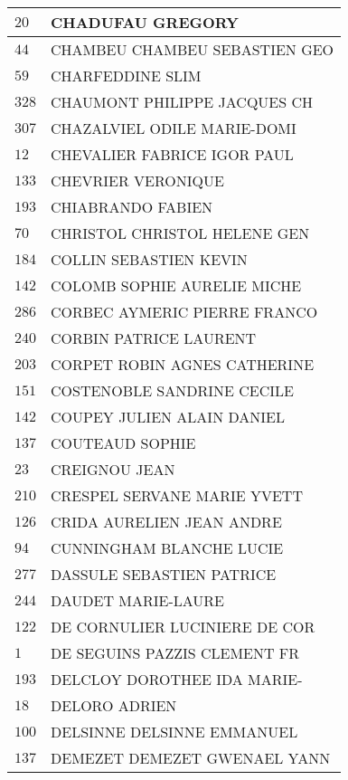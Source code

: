 \begin{xltabular}{\linewidth}{|l|X|}
    \hline
    $20$ & CHADUFAU GREGORY \\
    \hline
    $44$ & CHAMBEU CHAMBEU SEBASTIEN GEO \\
    \hline
    $59$ & CHARFEDDINE SLIM \\
    \hline
    $328$ & CHAUMONT PHILIPPE JACQUES CH \\
    \hline
    $307$ & CHAZALVIEL ODILE MARIE-DOMI \\
    \hline
    $12$ & CHEVALIER FABRICE IGOR PAUL \\
    \hline
    $133$ & CHEVRIER VERONIQUE \\
    \hline
    $193$ & CHIABRANDO FABIEN \\
    \hline
    $70$ & CHRISTOL CHRISTOL HELENE GEN \\
    \hline
    $184$ & COLLIN SEBASTIEN KEVIN \\
    \hline
    $142$ & COLOMB SOPHIE AURELIE MICHE \\
    \hline
    $286$ & CORBEC AYMERIC PIERRE FRANCO \\
    \hline
    $240$ & CORBIN PATRICE LAURENT \\
    \hline
    $203$ & CORPET ROBIN AGNES CATHERINE \\
    \hline
    $151$ & COSTENOBLE SANDRINE CECILE \\
    \hline
    $142$ & COUPEY JULIEN ALAIN DANIEL \\
    \hline
    $137$ & COUTEAUD SOPHIE \\
    \hline
    $23$ & CREIGNOU JEAN \\
    \hline
    $210$ & CRESPEL SERVANE MARIE YVETT \\
    \hline
    $126$ & CRIDA AURELIEN JEAN ANDRE \\
    \hline
    $94$ & CUNNINGHAM BLANCHE LUCIE \\
    \hline
    $277$ & DASSULE SEBASTIEN PATRICE \\
    \hline
    $244$ & DAUDET MARIE-LAURE \\
    \hline
    $122$ & DE CORNULIER LUCINIERE DE COR \\
    \hline
    $1$ & DE SEGUINS PAZZIS CLEMENT FR \\
    \hline
    $193$ & DELCLOY DOROTHEE IDA MARIE- \\
    \hline
    $18$ & DELORO ADRIEN \\
    \hline
    $100$ & DELSINNE DELSINNE EMMANUEL \\
    \hline
    $137$ & DEMEZET DEMEZET GWENAEL YANN \\

\end{xltabular}
